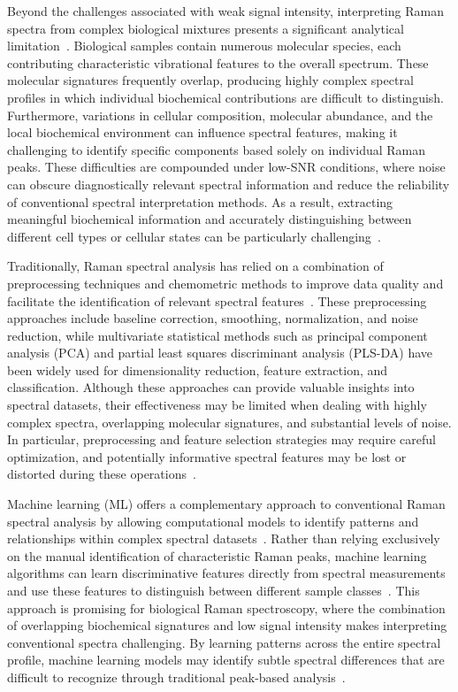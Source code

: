\documentclass[journal,onecolumn]{IEEEtran}
\begin{document}
Beyond the challenges associated with weak signal intensity, interpreting
Raman spectra from complex biological mixtures presents a significant
analytical limitation~\cite{yi2025surface}. Biological samples contain
numerous molecular species, each contributing characteristic vibrational
features to the overall spectrum. These molecular signatures frequently
overlap, producing highly complex spectral profiles in which individual
biochemical contributions are difficult to distinguish. Furthermore,
variations in cellular composition, molecular abundance, and the local
biochemical environment can influence spectral features, making it
challenging to identify specific components based solely on individual Raman
peaks. These difficulties are compounded under low-SNR conditions, where noise
can obscure diagnostically relevant spectral information and reduce the
reliability of conventional spectral interpretation methods. As a result,
extracting meaningful biochemical information and accurately distinguishing
between different cell types or cellular states can be particularly
challenging~\cite{smith2013modern}.

Traditionally, Raman spectral analysis has relied on a combination of
preprocessing techniques and chemometric methods to improve data quality and
facilitate the identification of relevant spectral
features~\cite{yi2025surface}. These preprocessing approaches include baseline
correction, smoothing, normalization, and noise reduction, while multivariate
statistical methods such as principal component analysis (PCA) and partial
least squares discriminant analysis (PLS-DA) have been widely used for
dimensionality reduction, feature extraction, and classification. Although
these approaches can provide valuable insights into spectral datasets, their
effectiveness may be limited when dealing with highly complex spectra,
overlapping molecular signatures, and substantial levels of noise. In
particular, preprocessing and feature selection strategies may require careful
optimization, and potentially informative spectral features may be lost or
distorted during these operations~\cite{zhang2024genotype}.

Machine learning (ML) offers a complementary approach to conventional Raman
spectral analysis by allowing computational models to identify patterns and
relationships within complex spectral datasets~\cite{liu2017deep}. Rather than
relying exclusively on the manual identification of characteristic Raman
peaks, machine learning algorithms can learn discriminative features directly
from spectral measurements and use these features to distinguish between
different sample classes~\cite{kazemzadeh2022deep}. This approach is promising
for biological Raman spectroscopy, where the combination of overlapping
biochemical signatures and low signal intensity makes interpreting conventional
spectra challenging. By learning patterns across the entire spectral profile,
machine learning models may identify subtle spectral differences that are
difficult to recognize through traditional peak-based analysis~\cite{luo2022deep}.
\end{document}
